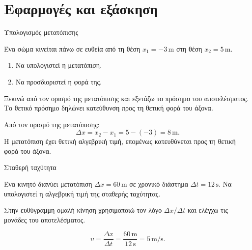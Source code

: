 \section{Εφαρμογές και εξάσκηση}
\begin{workedexample}{Υπολογισμός μετατόπισης}
\begin{ProblemBox}
Ένα σώμα κινείται πάνω σε ευθεία από τη θέση \(x_1=-3\,\mathrm{m}\) στη θέση \(x_2=5\,\mathrm{m}\).\par
\begin{enumerate}[label=\BookGreek*),leftmargin=7mm,topsep=1pt,itemsep=0pt]
\item Να υπολογιστεί η μετατόπιση.
\item Να προσδιοριστεί η φορά της.
\end{enumerate}
\end{ProblemBox}
\begin{ThinkBox}
Ξεκινώ από τον ορισμό της μετατόπισης και εξετάζω το πρόσημο του αποτελέσματος. Το θετικό πρόσημο δηλώνει κατεύθυνση προς τη θετική φορά του άξονα.
\end{ThinkBox}
\SolutionHeading
{} Από τον ορισμό της μετατόπισης:
\[\Delta x=x_2-x_1=5-(-3)=8\,\mathrm{m}.\]
 Η μετατόπιση έχει θετική αλγεβρική τιμή, επομένως κατευθύνεται προς τη θετική φορά του άξονα.
\end{workedexample}
\begin{workedexample}{Σταθερή ταχύτητα}
\begin{ProblemBox}
Ένα κινητό διανύει μετατόπιση \(\Delta x=60\,\mathrm{m}\) σε χρονικό διάστημα \(\Delta t=12\,\mathrm{s}\). Να υπολογιστεί η αλγεβρική τιμή της σταθερής ταχύτητας.
\end{ProblemBox}
\begin{ThinkBox}
Στην ευθύγραμμη ομαλή κίνηση χρησιμοποιώ τον λόγο \(\Delta x/\Delta t\) και ελέγχω τις μονάδες του αποτελέσματος.
\end{ThinkBox}
\SolutionHeading
\[\upsilon=\frac{\Delta x}{\Delta t}=\frac{60\,\mathrm{m}}{12\,\mathrm{s}}=5\,\mathrm{m/s}.\]
\end{workedexample}
\clearpage

